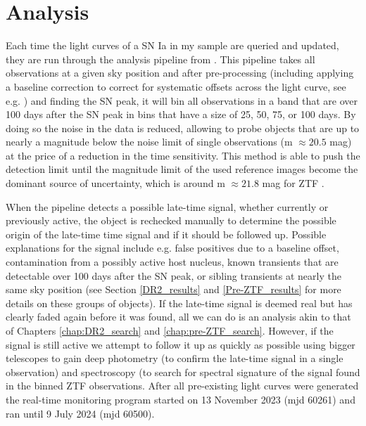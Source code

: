 \documentclass[a4paper,oneside,12pt, class=Latex/Classes/PhDthesisPSnPDF, crop=false]{standalone}
\begin{document}
\section{Analysis}
\label{analysis}
Each time the light curves of a SN Ia in my sample are queried and updated, they are run through the analysis pipeline from \citet{Terwel_2024_paper1}. This pipeline takes all observations at a given sky position and after pre-processing (including applying a baseline correction to correct for systematic offsets across the light curve, see e.g. \citealt{Yao_baseline_corr,Miller_baseline_corr}) and finding the SN peak, it will bin all observations in a band that are over 100 days after the SN peak in bins that have a size of 25, 50, 75, or 100 days. By doing so the noise in the data is reduced, allowing to probe objects that are up to nearly a magnitude below the noise limit of single observations (m $\approx20.5$ mag) at the price of a reduction in the time sensitivity. This method is able to push the detection limit until the magnitude limit of the used reference images become the dominant source of uncertainty, which is around m $\approx21.8$ mag for ZTF \citep{ref_uncert}.

When the pipeline detects a possible late-time signal, whether currently or previously active, the object is rechecked manually to determine the possible origin of the late-time time signal and if it should be followed up. Possible explanations for the signal include e.g. false positives due to a baseline offset, contamination from a possibly active host nucleus, known transients that are detectable over 100 days after the SN peak, or sibling transients at nearly the same sky position (see Section \ref{DR2_results} and \ref{Pre-ZTF_results} for more details on these groups of objects). If the late-time signal is deemed real but has clearly faded again before it was found, all we can do is an analysis akin to that of Chapters \ref{chap:DR2_search} and \ref{chap:pre-ZTF_search}. However, if the signal is still active we attempt to follow it up as quickly as possible using bigger telescopes to gain deep photometry (to confirm the late-time signal in a single observation) and spectroscopy (to search for spectral signature of the signal found in the binned ZTF observations. After all pre-existing light curves were generated the real-time monitoring program started on 13 November 2023 (mjd 60261) and ran until 9 July 2024 (mjd 60500).
\end{document}
